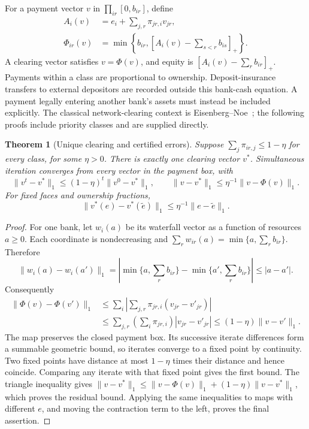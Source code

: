 \documentclass[11pt,a4paper]{article}
\numberwithin{equation}{section}
\newtheorem{theorem}{Theorem}[section]
\theoremstyle{definition}
\begin{document}
For a payment vector \(v\) in \(\prod_{ir}[0,b_{ir}]\), define
\begin{equation}\label{eq:waterfall}
\begin{aligned}
A_i(v)&=e_i+\sum_{j,r}\pi_{jr,i}v_{jr},\\
\Phi_{ir}(v)&=\min\left\{b_{ir},
                   \left[A_i(v)-\sum_{s<r}b_{is}\right]_+\right\}.
\end{aligned}
\end{equation}
A clearing vector satisfies \(v=\Phi(v)\), and equity is
\([A_i(v)-\sum_r b_{ir}]_+\). Payments within a class are proportional to
ownership. Deposit-insurance transfers to external depositors are recorded
outside this bank-cash equation. A payment legally entering another bank's
assets must instead be included explicitly. The classical network-clearing
context is Eisenberg--Noe~\cite{en}; the following proofs include priority
classes and are supplied directly.

\begin{theorem}[Unique clearing and certified errors]\label{thm:clearing}
Suppose \(\sum_j\pi_{ir,j}\le1-\eta\) for every class, for some \(\eta>0\).
There is exactly one clearing vector \(v^*\). Simultaneous iteration
converges from every vector in the payment box, with
\[
 \|v^t-v^*\|_1\le(1-\eta)^t\|v^0-v^*\|_1,\qquad
 \|v-v^*\|_1\le\eta^{-1}\|v-\Phi(v)\|_1.
\]
For fixed faces and ownership fractions,
\[
 \|v^*(e)-v^*(\widetilde e)\|_1
       \le \eta^{-1}\|e-\widetilde e\|_1.
\]
\end{theorem}
\begin{proof}
For one bank, let \(w_i(a)\) be its waterfall vector as a function of
resources \(a\ge0\). Each coordinate is nondecreasing and
\(\sum_r w_{ir}(a)=\min\{a,\sum_r b_{ir}\}\). Therefore
\[
\|w_i(a)-w_i(a')\|_1
 =\left|\min\{a,\sum_r b_{ir}\}-\min\{a',\sum_r b_{ir}\}\right|
 \le |a-a'|.
\]
Consequently
\[
\begin{split}
\|\Phi(v)-\Phi(v')\|_1
&\le\sum_i\left|\sum_{j,r}\pi_{jr,i}(v_{jr}-v'_{jr})\right|\\
&\le\sum_{j,r}\left(\sum_i\pi_{jr,i}\right)|v_{jr}-v'_{jr}|
 \le(1-\eta)\|v-v'\|_1.
\end{split}
\]
The map preserves the closed payment box. Its successive iterate
differences form a summable geometric bound, so iterates converge to a
fixed point by continuity. Two fixed points have distance at most
\(1-\eta\) times their distance and hence coincide. Comparing any iterate
with that fixed point gives the first bound. The triangle inequality gives
\(\|v-v^*\|_1\le\|v-\Phi(v)\|_1+(1-\eta)\|v-v^*\|_1\),
which proves the residual bound. Applying the same inequalities to maps
with different \(e\), and moving the contraction term to the left, proves
the final assertion.
\end{proof}
\end{document}
